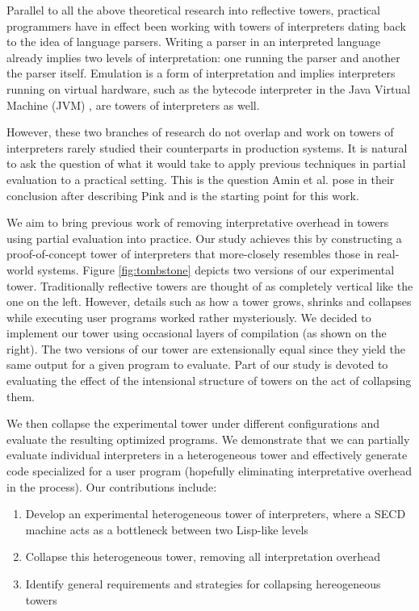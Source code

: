 \documentclass[sigplan,anonymous,review]{acmart}
\theoremstyle{definition}
\begin{document}
Parallel to all the above theoretical research into reflective towers, practical programmers have in effect been working with towers of interpreters dating back to the idea of language parsers. Writing a parser in an interpreted language already implies two levels of interpretation:
one running the parser and another the parser itself. Emulation is a form of interpretation and implies interpreters running on virtual hardware, such as the bytecode interpreter in the Java Virtual Machine (JVM) \cite{lindholm2014java}, are towers of interpreters as well.

However, these two branches of research do not overlap and work on towers of interpreters rarely studied their counterparts in production systems. It is natural to ask the question of what it would take to apply previous techniques in partial evaluation to a practical setting. This is the question Amin et al. pose in their conclusion after describing Pink \cite{amin2017collapsing} and is the starting point for this work.

We aim to bring previous work of removing interpretative overhead in towers using partial evaluation into practice. Our study achieves this by constructing a proof-of-concept tower of interpreters that more-closely resembles those in real-world systems. Figure \ref{fig:tombstone} depicts two versions of our experimental tower. Traditionally reflective towers are thought of as completely vertical like the one on the left. However, details such as how a tower grows, shrinks and collapses while executing user programs worked rather mysteriously. We decided to implement our tower using occasional layers of compilation (as shown on the right). The two versions of our tower are extensionally equal since they yield the same output for a given program to evaluate. Part of our study is devoted to evaluating the effect of the intensional structure of towers on the act of collapsing them.

We then collapse the experimental tower under different configurations and evaluate the resulting optimized programs. We demonstrate that we can partially evaluate individual interpreters in a heterogeneous tower and effectively generate code specialized for a user program (hopefully eliminating interpretative overhead in the process).
Our contributions include:
\begin{enumerate}
\item Develop an experimental heterogeneous tower of interpreters, where a SECD machine\cite{landin1964mechanical,kogge1990architecture} acts as a bottleneck between two Lisp-like levels
\item Collapse this heterogeneous tower, removing all interpretation overhead
\item Identify general requirements and strategies for collapsing hereogeneous towers
\end{enumerate}
\end{document}
